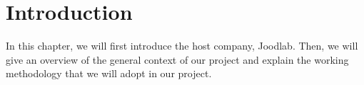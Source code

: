 \section*{Introduction}

In this chapter, we will first introduce the host company, Joodlab. Then, we will give an
overview of the general context of our project and explain the working methodology that we
will adopt in our project.
